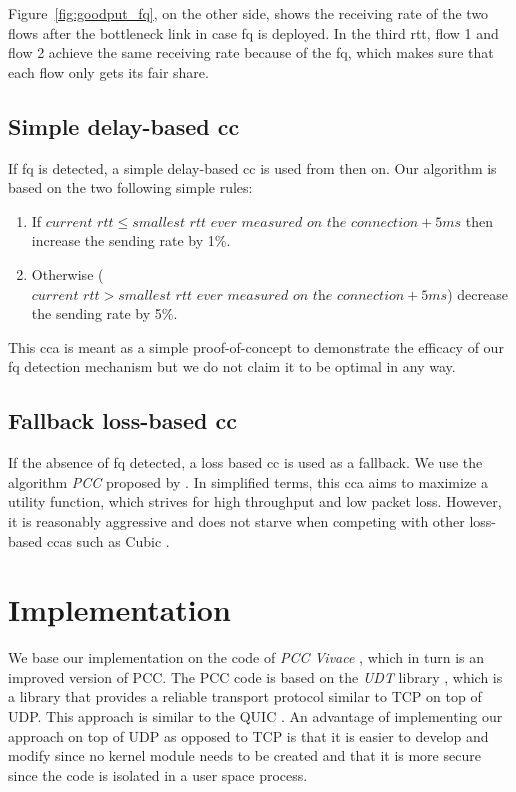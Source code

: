 \documentclass[runningheads]{llncs}
\begin{document}
Figure~\ref{fig:goodput_fq}, on the other side, shows the receiving rate of the two flows after the bottleneck link in case \gls{fq} is deployed. In the third \gls{rtt}, flow 1 and flow 2 achieve the same receiving rate because of the \gls{fq}, which makes sure that each flow only gets its fair share. 

\subsection{Simple delay-based \gls{cc}}

If \gls{fq} is detected, a simple delay-based \gls{cc} is used from then on. Our algorithm is based on the two following simple rules:
\begin{enumerate}
\item If $\textit{current rtt} \leq \textit{smallest rtt ever measured on the connection} + 5\textit{ms}$ then increase the sending rate by 1\%.
\item Otherwise ($\textit{current rtt} > \textit{smallest rtt ever measured on the connection} + 5\textit{ms}$) decrease the sending rate by 5\%.
\end{enumerate}

This \gls{cca} is meant as a simple proof-of-concept to demonstrate the efficacy of our \gls{fq} detection mechanism but we do not claim it to be optimal in any way. 

\subsection{Fallback loss-based \gls{cc}}

If the absence of \gls{fq} detected, a loss based \gls{cc} is used as a fallback. We use the algorithm \textit{PCC} proposed by \cite{dong_pcc_2015}. In simplified terms, this \gls{cca} aims to maximize a utility function, which strives for high throughput and low packet loss. However, it is reasonably aggressive and does not starve when competing with other loss-based \glspl{cca} such as Cubic \cite{ha_cubic_2008}.

\section{Implementation}

We base our implementation on the code of \textit{PCC Vivace} \cite{dong_pcc_2018}, which in turn is an improved version of PCC. The PCC code is based on the \textit{UDT} library \cite{gu_udt_2007}, which is a library that provides a reliable transport protocol similar to TCP on top of UDP. This approach is similar to the QUIC \cite{iyengar_quic_2018}. An advantage of implementing our approach on top of UDP as opposed to TCP is that it is easier to develop and modify since no kernel module needs to be created and that it is more secure since the code is isolated in a user space process. 
\end{document}
